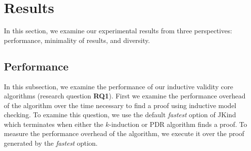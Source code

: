 \section{Results}
\label{sec:results}

\newcommand{\takeaway}[1]{
\vspace{6pt}
\noindent\fbox{\parbox{\columnwidth}{#1}}
\vspace{6pt}
}

In this section, we examine our experimental results from three perspectives: performance, minimality of \ucalg results, and diversity.

\subsection{Performance}
\label{sec:performance}

In this subsection, we examine the performance of our inductive validity core algorithms (research question \textbf{RQ1}).  First we examine the performance overhead of the \ucalg algorithm over the time necessary to find a proof using inductive model checking.  To examine this question, we use the default {\em fastest} option of JKind which terminates when either the $k$-induction or PDR algorithm finds a proof.  To measure the performance overhead of the \ucalg algorithm, we execute it over the proof generated by the {\em fastest} option.

